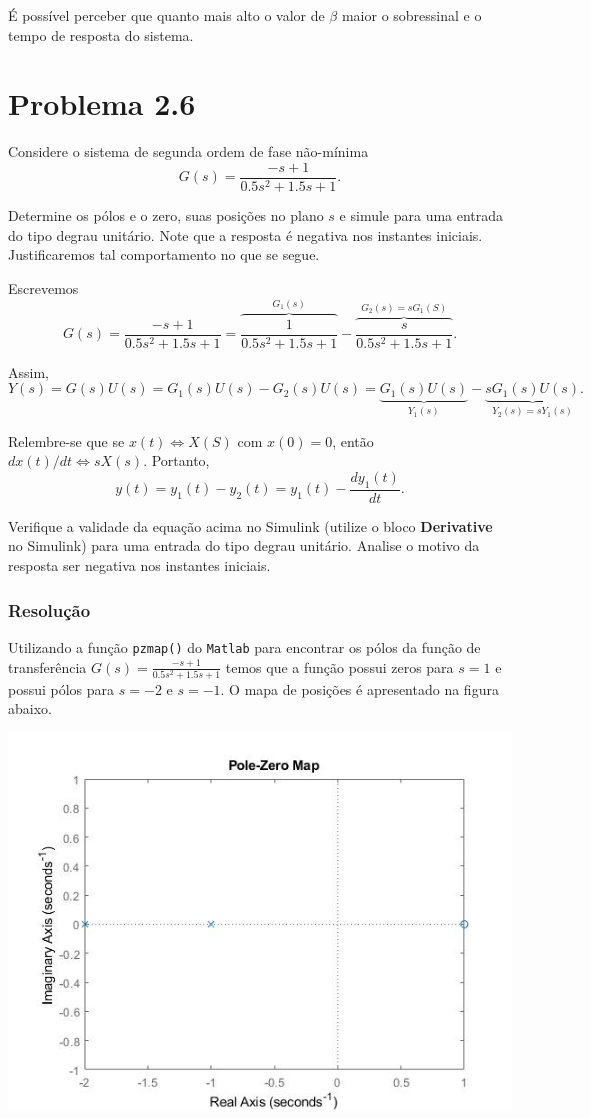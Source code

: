 \documentclass[
]{book}
\theoremstyle{definition}
\theoremstyle{definition}
\theoremstyle{definition}
\theoremstyle{remark}
\begin{document}
É possível perceber que quanto mais alto o valor de \(\beta\) maior o sobressinal e o tempo de resposta do sistema.

\hypertarget{problema-2.6}{%
\section*{Problema 2.6}\label{problema-2.6}}

Considere o sistema de segunda ordem de fase não-mínima
\[
G(s) = \frac {-s+1}{0.5s^2+1.5s+1}.
\]

Determine os pólos e o zero, suas posições no plano \(s\) e simule para uma entrada do tipo degrau unitário. Note que a resposta é negativa nos instantes iniciais. Justificaremos tal comportamento no que se segue.

Escrevemos
\[
G(s) = \frac {-s+1}{0.5s^2+1.5s+1} = \overbrace{\frac {1}{0.5s^2+1.5s+1}}^{G_1(s)} - \overbrace{\frac {s}{0.5s^2+1.5s+1}}^{G_2(s) = sG_1(S)}.
\]

Assim,
\[
Y(s) = G(s)U(s) = G_1(s)U(s)-G_2(s)U(s) = \underbrace{G_1(s)U(s)}_{Y_1(s)} - \underbrace{sG_1(s)U(s)}_{Y_2(s) = sY_1(s)}.
\]

Relembre-se que se \(x(t) \iff X(S)\) com \(x(0) = 0\), então \(dx(t)/dt \iff sX(s)\). Portanto,
\[
y(t) = y_1(t)-y_2(t)=y_1(t)- \frac {dy_1(t)}{dt}.
\]

Verifique a validade da equação acima no Simulink (utilize o bloco \textbf{Derivative} no Simulink) para uma entrada do tipo degrau unitário. Analise o motivo da resposta ser negativa nos instantes iniciais.

\hypertarget{resoluuxe7uxe3o-5}{%
\subsubsection*{Resolução}\label{resoluuxe7uxe3o-5}}

Utilizando a função \texttt{pzmap()} do \texttt{Matlab} para encontrar os pólos da função de transferência \(G(s) = \frac {-s +1}{0.5s^2+1.5s+1}\) temos que a função possui zeros para \(s=1\) e possui pólos para \(s = -2\) e \(s = -1\). O mapa de posições é apresentado na figura abaixo.

\includegraphics{Imagens/Lab2/prob6A.jpg}
\end{document}
